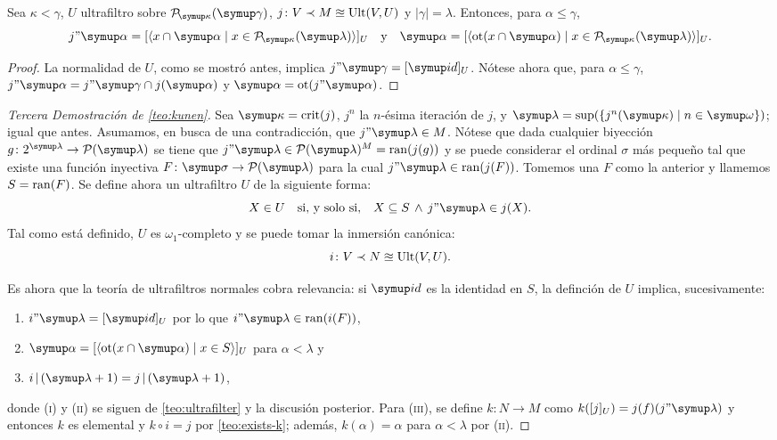 \begin{teo}\label{teo:ultrafilter}
    Sea $\kappa<\gamma$, $U$ ultrafiltro sobre $\pwset[\kappa]{\gamma}$,
    $j\colon V\prec M\approxeq\operatorname{Ult}(V, U)$ y $|\gamma|=\lambda$. Entonces,
    para $\alpha\leq\gamma$,
    \[
        j"\alpha=[\seq{x\cap \alpha\mid x\in\pwset[\kappa]{\lambda}}]_U
        \quad\text{y}\quad
        \alpha = [\seq{\ot(x\cap \alpha)\mid x\in\pwset[\kappa]{\lambda}}]_U.
    \]
\end{teo}

\begin{proof}
La normalidad de $U$, como se mostró antes, implica $j"\gamma = [\id]_U$.
Nótese ahora que, para $\alpha\leq\gamma$, $j"\alpha=j"\gamma\cap j(\alpha)$
y $\alpha=\ot(j"\alpha)$.
\end{proof}

\begin{proof}[Tercera Demostración de \ref{teo:kunen}]
    Sea $\kappa=\crit{j}$, $j^n$ la $n$-ésima iteración de $j$,
    y $\lambda=\sup(\set{j^n(\kappa)\mid n\in\omega})$; igual que antes.
    Asumamos, en busca de una contradicción, que $j"\lambda\in M$.
    Nótese que dada cualquier biyección $g\colon 2^\lambda\to\pwset{\lambda}$ se tiene que
    $j"\lambda\in\pwset{\lambda}^M = \ran(j(g))$ y se puede considerar el ordinal $\sigma$ más
    pequeño tal que existe una función inyectiva $F\colon\sigma\to\pwset{\lambda}$ para la cual
    $j"\lambda\in \ran(j(F))$. Tomemos una $F$ como la anterior y llamemos $S=\operatorname{ran}(F)$.
    Se define ahora un ultrafiltro $U$ de la siguiente forma:
    \[
        X\in U\quad\text{si, y solo si,}\quad X\subseteq S \,\land\, j"\lambda\in j(X).
    \]
    Tal como está definido, $U$ es $\omega_1$-completo y se puede tomar la inmersión canónica:
    \[
        i\colon V\prec N\approxeq\operatorname{Ult}(V, U).
    \]

    Es ahora que la teoría de ultrafiltros normales cobra relevancia: si $\id$
    es la identidad en $S$, la definción de $U$ implica, sucesivamente:
    \begin{enumerate}[label=(\roman*)]
        \item $i"\lambda = [\id]_U$ por lo que $i"\lambda\in\ran(i(F))$,
        \item $\alpha = [\seq{\ot(x\cap\alpha)\mid x\in S}]_U$ para $\alpha<\lambda$ y
        \item $i\rest(\lambda+1) = j\rest(\lambda+1)$,
    \end{enumerate}
    donde (\textsc{i}) y (\textsc{ii}) se siguen de \ref{teo:ultrafilter} y la discusión
    posterior. Para (\textsc{iii}), se define $k\colon N\to M$ como
    $k([j]_U) = j(f)(j"\lambda)$ y entonces $k$ es elemental y $k\circ i = j$
    por \ref{teo:exists-k}; además, $k(\alpha)=\alpha$ para $\alpha<\lambda$ por
    (\textsc{ii}).


\end{proof}

